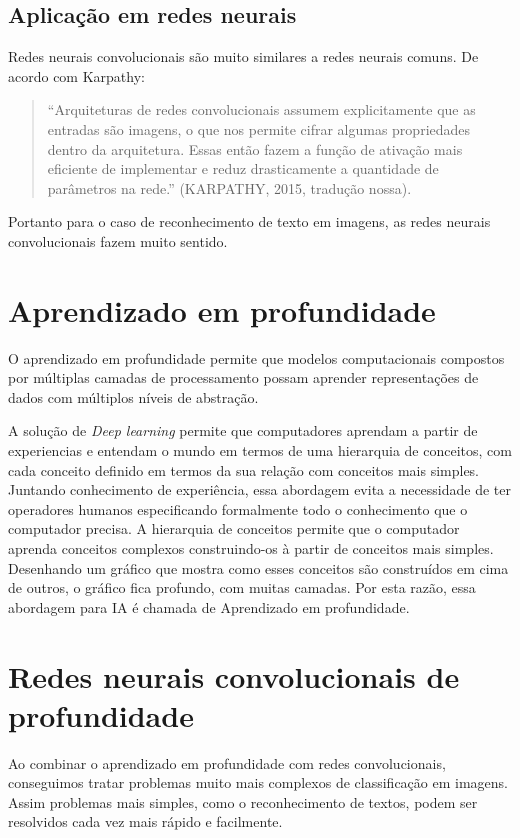 \subsection{Aplicação em redes neurais}

Redes neurais convolucionais são muito similares a redes neurais
comuns. De acordo com Karpathy\cite{Karpathy}:
\begin{quote}
  ``Arquiteturas de redes convolucionais assumem explicitamente que as
  entradas são imagens, o que nos permite cifrar algumas propriedades
  dentro da arquitetura. Essas então fazem a função de ativação mais
  eficiente de implementar e reduz drasticamente a quantidade de
  parâmetros na rede.'' (KARPATHY, 2015, tradução nossa).
\end{quote}

Portanto para o caso de reconhecimento de texto em imagens, as redes
neurais convolucionais fazem muito sentido.

\section{Aprendizado em profundidade}

O aprendizado em profundidade permite que modelos computacionais
compostos por múltiplas camadas de processamento possam aprender
representações de dados com múltiplos níveis de abstração\cite{LeCun}.

A solução de \textit{Deep learning} permite que computadores aprendam
a partir de experiencias e entendam o mundo em termos de uma
hierarquia de conceitos, com cada conceito definido em termos da sua
relação com conceitos mais simples. Juntando conhecimento de
experiência, essa abordagem evita a necessidade de ter operadores
humanos especificando formalmente todo o conhecimento que o computador
precisa. A hierarquia de conceitos permite que o computador aprenda
conceitos complexos construindo-os à partir de conceitos mais
simples. Desenhando um gráfico que mostra como esses conceitos são
construídos em cima de outros, o gráfico fica profundo, com muitas
camadas. Por esta razão, essa abordagem para IA é chamada de
Aprendizado em profundidade\cite{Goodfellow-et-al-2016-Book}.

\section{Redes neurais convolucionais de profundidade}

Ao combinar o aprendizado em profundidade com redes convolucionais,
conseguimos tratar problemas muito mais complexos de classificação em
imagens. Assim problemas mais simples, como o reconhecimento de
textos, podem ser resolvidos cada vez mais rápido e facilmente.

